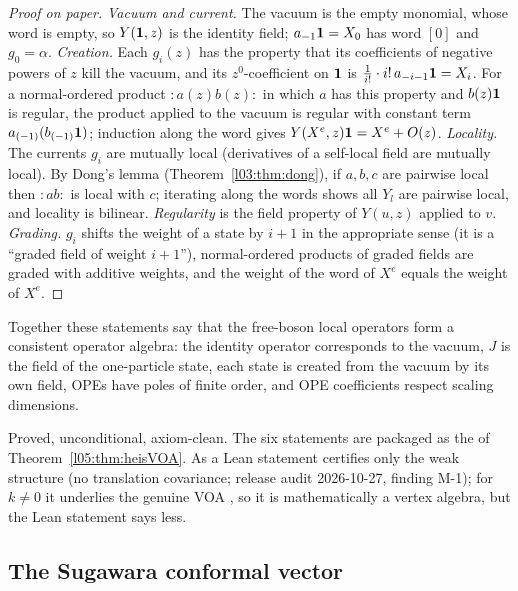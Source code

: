 \begin{proof}[Proof on paper]
\emph{Vacuum and current.} The vacuum is the empty monomial, whose word is empty, so $Y(\mathbf{1},z)$ is the
identity field; $a_{-1}\mathbf{1}=X_0$ has word $[0]$ and $g_0=\alpha$.
\emph{Creation.} Each $g_i(z)$ has the property that its coefficients of negative powers of $z$ kill the
vacuum, and its $z^0$-coefficient on $\mathbf{1}$ is $\frac1{i!}\cdot i!\,a_{-i-1}\mathbf{1}=X_i$. For a
normal-ordered product ${:}a(z)b(z){:}$ in which $a$ has this property and $b(z)\mathbf{1}$ is regular, the
product applied to the vacuum is regular with constant term $a_{(-1)}(b_{(-1)}\mathbf{1})$; induction along
the word gives $Y(X^e,z)\mathbf{1}=X^e+O(z)$.
\emph{Locality.} The currents $g_i$ are mutually local (derivatives of a self-local field are mutually
local). By Dong's lemma (Theorem~\ref{l03:thm:dong}), if $a,b,c$ are pairwise local then ${:}ab{:}$ is local
with $c$; iterating along the words shows all $Y_l$ are pairwise local, and locality is bilinear.
\emph{Regularity} is the field property of $Y(u,z)$ applied to $v$.
\emph{Grading.} $g_i$ shifts the weight of a state by $i+1$ in the appropriate sense (it is a ``graded field
of weight $i+1$''), normal-ordered products of graded fields are graded with additive weights, and the weight
of the word of $X^e$ equals the weight of $X^e$.
\end{proof}

\begin{physics}
Together these statements say that the free-boson local operators form a consistent operator algebra:
the identity operator corresponds to the vacuum, $J$ is the field of the one-particle state, each state is
created from the vacuum by its own field, OPEs have poles of finite order, and OPE coefficients respect
scaling dimensions.
\end{physics}

\begin{status}
Proved, unconditional, axiom-clean. The six statements are packaged as the 
 of Theorem~\ref{l05:thm:heisVOA}. As a Lean statement  certifies only the weak structure
(no translation covariance; release audit 2026-10-27, finding M-1); for $k\neq0$ it underlies the genuine VOA
, so it is mathematically a vertex algebra, but the Lean statement says less.
\end{status}

\subsection{The Sugawara conformal vector}


